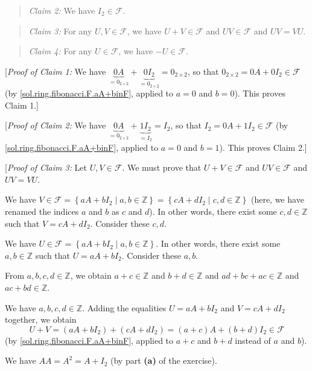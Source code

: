 \documentclass[paper=a4, fontsize=12pt]{scrartcl}%
\theoremstyle{plainsl}
\theoremstyle{definition}
\theoremstyle{remark}
\newenvironment{statement}{\begin{quote}}{\end{quote}}
\begin{document}
\begin{statement}
\textit{Claim 2:} We have $I_{2}\in\mathcal{F}$.
\end{statement}

\begin{statement}
\textit{Claim 3:} For any $U,V\in\mathcal{F}$, we have $U+V\in\mathcal{F}$ and
$UV\in\mathcal{F}$ and $UV=VU$.
\end{statement}

\begin{statement}
\textit{Claim 4:} For any $U\in\mathcal{F}$, we have $-U\in\mathcal{F}$.
\end{statement}

[\textit{Proof of Claim 1:} We have $\underbrace{0A}_{=0_{2\times2}%
}+\underbrace{0I_{2}}_{=0_{2\times2}}=0_{2\times2}$, so that $0_{2\times
2}=0A+0I_{2}\in\mathcal{F}$ (by \eqref{sol.ring.fibonacci.F.aA+binF}, applied
to $a=0$ and $b=0$). This proves Claim 1.]

[\textit{Proof of Claim 2:} We have $\underbrace{0A}_{=0_{2\times2}%
}+\underbrace{1I_{2}}_{=I_{2}}=I_{2}$, so that $I_{2}=0A+1I_{2}\in\mathcal{F}$
(by \eqref{sol.ring.fibonacci.F.aA+binF}, applied to $a=0$ and $b=1$). This
proves Claim 2.]

[\textit{Proof of Claim 3:} Let $U,V\in\mathcal{F}$. We must prove that
$U+V\in\mathcal{F}$ and $UV\in\mathcal{F}$ and $UV=VU$.

We have $V\in\mathcal{F}=\left\{  aA+bI_{2}\mid a,b\in\mathbb{Z}\right\}
=\left\{  cA+dI_{2}\mid c,d\in\mathbb{Z}\right\}  $ (here, we have renamed the
indices $a$ and $b$ as $c$ and $d$). In other words, there exist some
$c,d\in\mathbb{Z}$ such that $V=cA+dI_{2}$. Consider these $c,d$.

We have $U\in\mathcal{F}=\left\{  aA+bI_{2}\mid a,b\in\mathbb{Z}\right\}  $.
In other words, there exist some $a,b\in\mathbb{Z}$ such that $U=aA+bI_{2}$.
Consider these $a,b$.

From $a,b,c,d\in\mathbb{Z}$, we obtain $a+c\in\mathbb{Z}$ and $b+d\in
\mathbb{Z}$ and $ad+bc+ac\in\mathbb{Z}$ and $ac+bd\in\mathbb{Z}$.

We have $a,b,c,d\in\mathbb{Z}$. Adding the equalities $U=aA+bI_{2}$ and
$V=cA+dI_{2}$ together, we obtain%
\[
U+V=\left(  aA+bI_{2}\right)  +\left(  cA+dI_{2}\right)  =\left(  a+c\right)
A+\left(  b+d\right)  I_{2}\in\mathcal{F}%
\]
(by \eqref{sol.ring.fibonacci.F.aA+binF}, applied to $a+c$ and $b+d$ instead
of $a$ and $b$).

We have $AA=A^{2}=A+I_{2}$ (by part \textbf{(a)} of the exercise).
\end{document}
